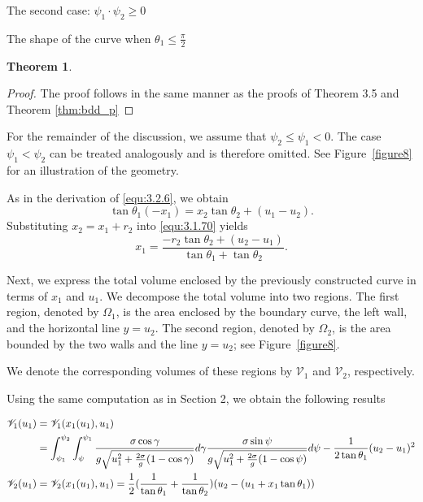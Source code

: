 \documentclass[letterpaper,reqno,10pt,twoside]{amsart}
\newtheorem{theorem}{Theorem}[section]
\theoremstyle{definition}
\theoremstyle{remark}
\begin{document}
\begin{section}{The second case: $\psi_1\cdot \psi_2\geq 0$ }
\begin{subsection}{The shape of the curve when $\theta_1\leq \frac{\pi}{2}$}
\begin{theorem}
        
        \end{theorem}

        \begin{proof}

            The proof follows in the same manner as the proofs of Theorem 3.5 and Theorem \ref{thm:bdd_p} 
        \end{proof}

       For the remainder of the discussion, we assume that $\psi_2 \le \psi_1 < 0$.  
The case $\psi_1 < \psi_2$ can be treated analogously and is therefore omitted.  
See Figure~\ref{figure8} for an illustration of the geometry.

As in the derivation of \eqref{equ:3.2.6}, we obtain
\begin{equation}\label{equ:3.1.70}
    \tan\theta_1 (-x_1)=x_2\tan\theta_2+(u_1-u_2).
\end{equation}
Substituting $x_2=x_1+r_2$ into \eqref{equ:3.1.70} yields
\begin{equation}\label{equ:3.1.34}
    x_1=\frac{-r_2\tan\theta_2+(u_2-u_1)}{\tan\theta_1+\tan\theta_2}.
\end{equation}

Next, we express the total volume enclosed by the previously constructed curve in terms of $x_1$ and $u_1$.  
We decompose the total volume into two regions. The first region, denoted by $\Omega_1$, is the area enclosed by the boundary curve, the left wall, and the horizontal line $y=u_2$. The second region, denoted by $\Omega_2$, is the area bounded by the two walls and the line $y=u_2$; see Figure~\ref{figure8}.  

We denote the corresponding volumes of these regions by $\mathscr{V}_1$ and $\mathscr{V}_2$, respectively.

         Using the same computation as in Section 2, we obtain the following results

         \begin{align}
             {\mathscr{V}}_1(u_1)&=\mathscr{V}_1(x_1(u_1),u_1)\notag \\
             &=\int_{\psi_1}^{\psi_2}\int_{\psi}^{\psi_1}\frac{\sigma\cos\gamma}{g\sqrt{u_1^{2}+\frac{2\sigma}{g}(1-\cos\gamma)}}d\gamma \frac{\sigma\sin\psi}{g\sqrt{u_1^{2}+\frac{2\sigma}{g}(1-\cos\psi)}}d\psi-\frac{1}{2\tan\theta_1}(u_2-u_1)^{2} \label{equ:3.1.35}\\
             {\mathscr{V}}_2(u_1)&=\mathscr{V}_2(x_1(u_1),u_1)=\frac{1}{2}(\frac{1}{\tan\theta_1}+\frac{1}{\tan\theta_2})(u_2-(u_1+x_1\tan\theta_1)) \label{equ:3.1.36}
         \end{align}
        


\end{subsection}
\end{section}
\end{document}
